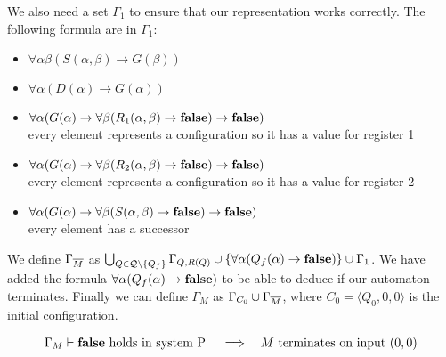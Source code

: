 We also need a set $\Gamma_1$ to ensure that our representation works correctly. The following formula are in $\Gamma_1$:
\begin{itemize} %
	\item $\forall\alpha\beta(S(\alpha,\beta)\to G(\beta))$
	\item $\forall\alpha(D(\alpha)\to G(\alpha))$	
	\item $\forall\alpha(G(\alpha)\to\forall\beta(R_1(\alpha,\beta)\to\textbf{false})\to\textbf{false})$\\every element represents a configuration so it has a value for register 1
	\item $\forall\alpha(G(\alpha)\to\forall\beta(R_2(\alpha,\beta)\to\textbf{false})\to\textbf{false})$\\every element represents a configuration so it has a value for register 2
	\item $\forall\alpha(G(\alpha)\to\forall\beta(S(\alpha,\beta)\to\textbf{false})\to\textbf{false})$\\every element has a successor
\end{itemize}
We define $\Gamma_{\overline{M}}$ as $\bigcup_{Q\in\mathcal{Q}\setminus\{Q_f\}}\Gamma_{Q,R(Q)}\cup\{\forall\alpha(Q_f(\alpha)\to\textbf{false})\}\cup\Gamma_1$. We have added the formula $\forall\alpha(Q_f(\alpha)\to\textbf{false})$ to be able to deduce \false{} if our automaton terminates.
Finally we can define $\Gamma_M$ as $\Gamma_{C_0}\cup\Gamma_{\overline{M}}$, where $C_0=\langle Q_0,0,0\rangle$ is the initial configuration.
\begin{claim}\label{cla.3.5}
	\begin{align*}
		  & \text{$\Gamma_M\vdash\textbf{false}$ holds in system P} &   & \implies & \text{$M$ terminates on input $(0,0)$} 
	\end{align*}
\end{claim}
